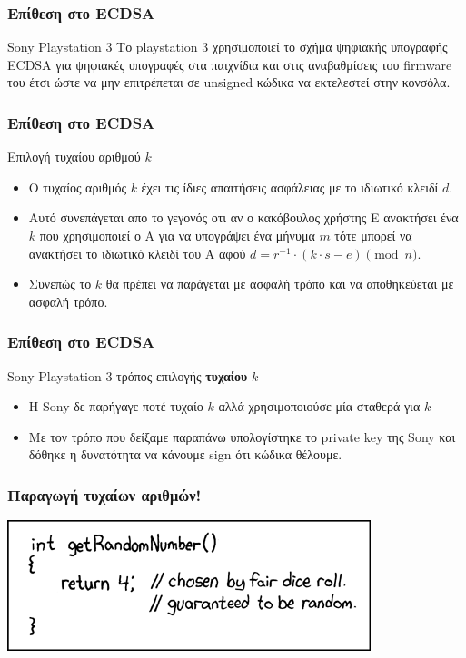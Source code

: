 \documentclass{beamer}
\begin{document}
%
\begin{frame}
\frametitle{Επίθεση στο ECDSA}
\begin{block}
{Sony Playstation 3}
Το playstation 3 χρησιμοποιεί το σχήμα ψηφιακής υπογραφής ECDSA για ψηφιακές υπογραφές στα παιχνίδια και στις αναβαθμίσεις του firmware του έτσι ώστε να μην επιτρέπεται σε unsigned κώδικα να εκτελεστεί στην κονσόλα.
\end{block}
\end{frame}

%
\begin{frame}
\frametitle{Επίθεση στο ECDSA}
\begin{block}
{Επιλογή τυχαίου αριθμού $k$}
\begin{itemize}
\item Ο τυχαίος αριθμός $k$ έχει τις ίδιες απαιτήσεις ασφάλειας με το ιδιωτικό κλειδί $d$. 
\item Αυτό συνεπάγεται απο το γεγονός οτι αν ο κακόβουλος χρήστης Ε ανακτήσει ένα $k$ που χρησιμοποιεί ο Α για να υπογράψει ένα μήνυμα $m$ τότε μπορεί να ανακτήσει το ιδιωτικό κλειδί του A αφού $d = r^{-1} \cdot (k \cdot s - e) \pmod n$.
\item Συνεπώς το $k$ θα πρέπει να παράγεται με ασφαλή τρόπο και να αποθηκεύεται με ασφαλή τρόπο.
\end{itemize}
\end{block}
\end{frame}

%
\begin{frame}
\frametitle{Επίθεση στο ECDSA}
\begin{block}
{Sony Playstation 3 τρόπος επιλογής \textbf{τυχαίου} $k$}
\begin{itemize}
\item Η Sony δε παρήγαγε ποτέ τυχαίο $k$ αλλά χρησιμοποιούσε μία σταθερά για $k$
\item Με τον τρόπο που δείξαμε παραπάνω υπολογίστηκε το private key της Sony και δόθηκε η δυνατότητα να κάνουμε sign ότι κώδικα θέλουμε. \cite{PS3}
\end{itemize}
\end{block}
\end{frame}

 \begin{frame}
\frametitle{Παραγωγή τυχαίων αριθμών!}
 \includegraphics[scale=0.7]{random_number.png}
\end{frame}
\end{document}
